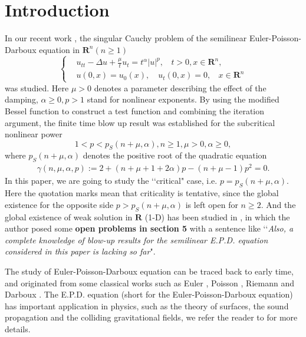 \documentclass[review]{elsarticle}
\newcommand{\R}{\mathbf{R}}
\begin{document}

\section{Introduction}



\par\quad
In our recent work \cite{FLT}, the singular Cauchy problem of the semilinear Euler-Poisson-Darboux
equation
in $\R^n(n\ge 1)$
\begin{equation}
\label{SHEPD}
\left\{
\begin{aligned}
& u_{tt}-\Delta u+\frac{\mu}{t}u_t=t^\alpha|u|^p, ~~~~t>0, x\in \R^n,\\
& u(0, x)=u_0(x), \quad u_t(0, x)=0,~~~~x\in \R^n
\end{aligned}
\right.
\end{equation}
 was studied. Here $\mu>0$ denotes a parameter describing the effect of the damping, $\alpha\ge 0, p>1$ stand for nonlinear exponents. By using the modified Bessel function to construct a test function and combining the iteration argument, the finite time blow up result was established for the subcritical nonlinear power
\[
1<p<p_S(n+\mu, \alpha), n\ge 1, \mu>0,\alpha\geq0,
\]
where $p_S(n+\mu, \alpha)$ denotes the positive root of the quadratic equation
\begin{equation}\label{gmnmupalpha}
\begin{aligned}
\gamma(n, \mu, \alpha, p):=2+(n+\mu+1+2\alpha)p-(n+\mu-1)p^2=0.
\end{aligned}
\end{equation}
In this paper, we are going to study the \lq\lq critical" case, i.e. $p=p_S(n+\mu, \alpha)$. Here the quotation marks mean that criticality is tentative, since the global existence for the opposite side $p>p_S(n+\mu, \alpha)$ is left open for $n\ge 2$. And the global existence of weak solution in $\R$ (1-D) has been studied in \cite{Dab}, in which the author posed some \textbf{open problems in section 5} with a sentence like \lq\lq \textit {Also, a complete knowledge of blow-up results for the semilinear E.P.D. equation considered
in this paper is lacking so far}".

The study of Euler-Poisson-Darboux equation can be traced back to early time, and originated from some classical works such as Euler \cite{Euler70}, Poisson \cite{Pos23}, Riemann \cite{Rie76} and Darboux \cite{Dar15}. The E.P.D. equation (short for the Euler-Poisson-Darboux equation) has important application in physics, such as the
theory of surfaces, the sound propagation and the colliding gravitational fields, we refer the reader to \cite{Wei54, Wei55, Bre73, UKa13, WCh16} for more details.
\end{document}

